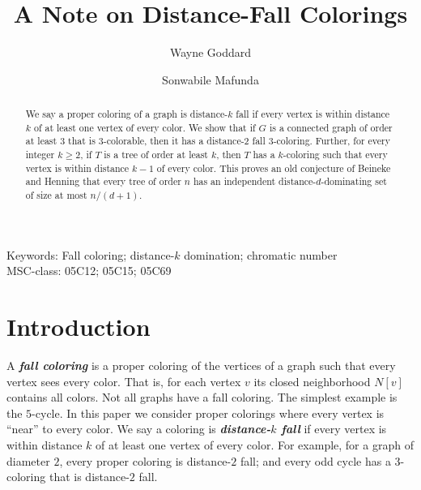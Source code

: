 \documentclass[a4paper,11pt]{article}
\numberwithin{equation}{theorem}
\newcommand{\dd}[1]{\textbf{\textit{#1}}}
\begin{document}
\title{A Note on Distance-Fall Colorings}

\author[1]{Wayne Goddard}
\author[2,3]{Sonwabile Mafunda}

\maketitle





\begin{abstract}
We say a proper coloring  of a graph is distance-$k$ fall if every vertex is within distance $k$ 
of at least one vertex of every color. We show that 
if $G$ is a connected graph of order at least $3$ that is $3$-colorable, then
it has a distance-2 fall 3-coloring. Further, for every integer $k\ge 2$,
if $T$ is a tree of order at least $k$, then $T$ has a $k$-coloring 
such that every vertex is within distance $k-1$ of every color.
This proves an old conjecture of Beineke and Henning that every tree
of order $n$ has an independent distance-$d$-dominating set of size at most $n/(d + 1)$.
\end{abstract}


Keywords: Fall coloring; distance-$k$ domination; chromatic number\\[5mm]
MSC-class: 05C12; 05C15; 05C69





\section{Introduction}
A \dd{fall coloring} is a proper coloring of the vertices of a graph such that every vertex sees every color. 
That is, for each vertex $v$ its closed neighborhood $N[v]$ contains all colors.
Not all graphs have a fall coloring. The simplest example is the $5$-cycle.
In this paper we consider proper colorings where every vertex is ``near'' to every color.
We say a coloring is \dd{distance-$k$ fall} if every vertex is within distance $k$ 
of at least one vertex of every color. For example, 
for a graph of diameter $2$, every proper coloring is distance-$2$ fall;
and every odd cycle has a $3$-coloring that is distance-$2$ fall.
\end{document}
